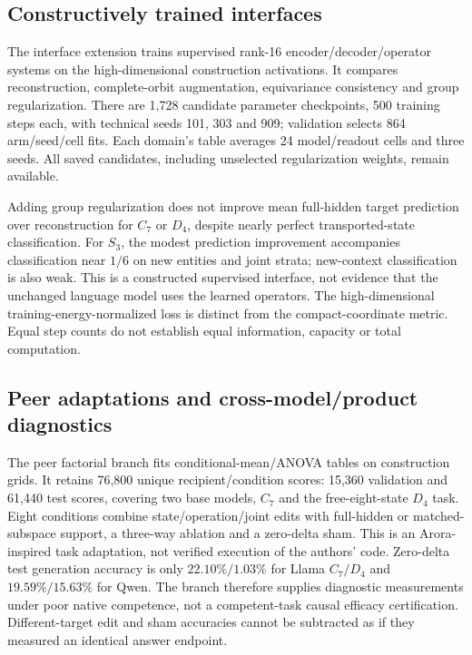 \subsection{Constructively trained interfaces}

The interface extension trains supervised rank-16 encoder/decoder/operator systems on the high-dimensional construction activations. It compares reconstruction, complete-orbit augmentation, equivariance consistency and group regularization. There are 1,728 candidate parameter checkpoints, 500 training steps each, with technical seeds 101, 303 and 909; validation selects 864 arm/seed/cell fits. Each domain's table averages 24 model/readout cells and three seeds. All saved candidates, including unselected regularization weights, remain available.

Adding group regularization does not improve mean full-hidden target prediction over reconstruction for $C_7$ or $D_4$, despite nearly perfect transported-state classification. For $S_3$, the modest prediction improvement accompanies classification near $1/6$ on new entities and joint strata; new-context classification is also weak. This is a constructed supervised interface, not evidence that the unchanged language model uses the learned operators. The high-dimensional training-energy-normalized loss is distinct from the compact-coordinate metric. Equal step counts do not establish equal information, capacity or total computation.

\subsection{Peer adaptations and cross-model/product diagnostics}

The peer factorial branch fits conditional-mean/ANOVA tables on construction grids. It retains 76,800 unique recipient/condition scores: 15,360 validation and 61,440 test scores, covering two base models, $C_7$ and the free-eight-state $D_4$ task. Eight conditions combine state/operation/joint edits with full-hidden or matched-subspace support, a three-way ablation and a zero-delta sham. This is an Arora-inspired task adaptation, not verified execution of the authors' code. Zero-delta test generation accuracy is only $22.10\%/1.03\%$ for Llama $C_7/D_4$ and $19.59\%/15.63\%$ for Qwen. The branch therefore supplies diagnostic measurements under poor native competence, not a competent-task causal efficacy certification. Different-target edit and sham accuracies cannot be subtracted as if they measured an identical answer endpoint.

